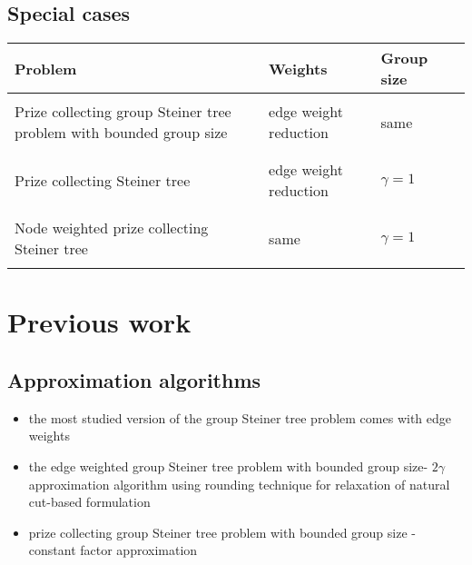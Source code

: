 \documentclass{beamer}
\begin{document}
\subsection*{Special cases}
\begin{frame}{\insertsection}{\insertsubsection}
    \begin{block}{}
        \begin{tabular}{|p{}|p{}|p{}|p{}|}
            \hline
            Problem&Weights&Group size\\ \hline\hline
            &&\\ 
            Prize collecting group Steiner tree problem with bounded group size& edge weight reduction &same\\ &&\\ \hline 
            &&\\
            Prize collecting Steiner tree & edge weight reduction & $\gamma = 1$ \\
            &&\\ \hline 
            &&\\
            Node weighted prize collecting Steiner tree & same & $\gamma = 1$\\
            &&\\ \hline
        \end{tabular}
    \end{block}
\end{frame}


\section{Previous work}
\subsection*{Approximation algorithms}
\begin{frame}{\insertsection}{\insertsubsection}
    \begin{block}{}
        \begin{itemize}
            \item the most studied version of the group Steiner tree problem comes with edge weights \autocite{gargPolylogarithmicApproximationAlgorithm2000}
            \item the edge weighted group Steiner tree problem with bounded group size-  $2\gamma$ approximation algorithm using rounding technique for relaxation of natural cut-based formulation \autocite{slavikApproximationAlgorithmsSet1998}
            \item prize collecting group Steiner tree problem with bounded group size - constant factor approximation \autocite{glicksmanApproximationAlgorithmsGroup2008}
        \end{itemize}
    \end{block}
\end{frame}
\end{document}
